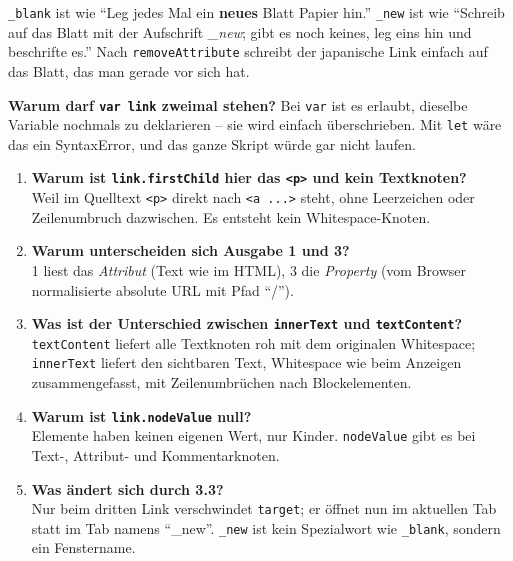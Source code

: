 \documentclass[a4paper,11pt]{article}
\begin{document}
\begin{analogie}
\texttt{\_blank} ist wie "`Leg jedes Mal ein \textbf{neues} Blatt Papier hin."' \texttt{\_new} ist wie "`Schreib
auf das Blatt mit der Aufschrift \emph{\_new}; gibt es noch keines, leg eins hin und beschrifte es."'
Nach \texttt{removeAttribute} schreibt der japanische Link einfach auf das Blatt, das man gerade vor sich hat.
\end{analogie}

\textbf{Warum darf \texttt{var link} zweimal stehen?} Bei \texttt{var} ist es erlaubt, dieselbe Variable nochmals
zu deklarieren -- sie wird einfach überschrieben. Mit \texttt{let} wäre das ein SyntaxError, und das ganze Skript
würde gar nicht laufen.

\begin{tutor}
\begin{enumerate}[leftmargin=*]
\item \textbf{Warum ist \texttt{link.firstChild} hier das \texttt{<p>} und kein Textknoten?}\\
  Weil im Quelltext \texttt{<p>} direkt nach \texttt{<a ...>} steht, ohne Leerzeichen oder Zeilenumbruch
  dazwischen. Es entsteht kein Whitespace-Knoten.
\item \textbf{Warum unterscheiden sich Ausgabe 1 und 3?}\\
  1 liest das \emph{Attribut} (Text wie im HTML), 3 die \emph{Property} (vom Browser normalisierte absolute
  URL mit Pfad "`/"').
\item \textbf{Was ist der Unterschied zwischen \texttt{innerText} und \texttt{textContent}?}\\
  \texttt{textContent} liefert alle Textknoten roh mit dem originalen Whitespace; \texttt{innerText} liefert den
  sichtbaren Text, Whitespace wie beim Anzeigen zusammengefasst, mit Zeilenumbrüchen nach Blockelementen.
\item \textbf{Warum ist \texttt{link.nodeValue} null?}\\
  Elemente haben keinen eigenen Wert, nur Kinder. \texttt{nodeValue} gibt es bei Text-, Attribut- und
  Kommentarknoten.
\item \textbf{Was ändert sich durch 3.3?}\\
  Nur beim dritten Link verschwindet \texttt{target}; er öffnet nun im aktuellen Tab statt im Tab namens
  "`\_new"'. \texttt{\_new} ist kein Spezialwort wie \texttt{\_blank}, sondern ein Fenstername.
\end{enumerate}
\end{tutor}
\end{document}
